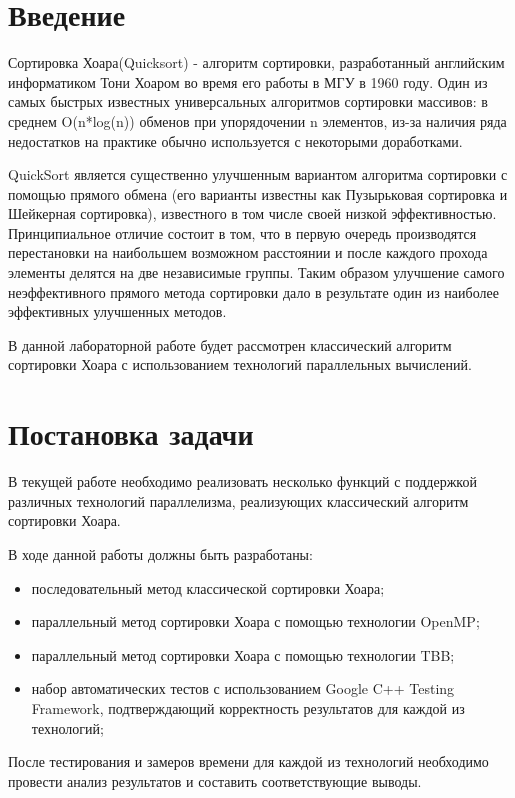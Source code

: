 \documentclass{report}
\begin{document}
\setcounter{page}{2}

\tableofcontents
\newpage

\section*{Введение}
Сортировка Хоара(Quicksort) - алгоритм сортировки, разработанный английским информатиком Тони Хоаром во время его работы в МГУ в 1960 году. Один из самых быстрых известных универсальных алгоритмов сортировки массивов: в среднем O(n*log(n)) обменов при упорядочении n элементов, из-за наличия ряда недостатков на практике обычно используется с некоторыми доработками.
\par QuickSort является существенно улучшенным вариантом алгоритма сортировки с помощью прямого обмена (его варианты известны как Пузырьковая сортировка и Шейкерная сортировка), известного в том числе своей низкой эффективностью. Принципиальное отличие состоит в том, что в первую очередь производятся перестановки на наибольшем возможном расстоянии и после каждого прохода элементы делятся на две независимые группы. Таким образом улучшение самого неэффективного прямого метода сортировки дало в результате один из наиболее эффективных улучшенных методов.
\par В данной лабораторной работе будет рассмотрен классический алгоритм сортировки Хоара с использованием технологий параллельных вычислений.
\newpage

\section*{Постановка задачи}
В текущей работе необходимо реализовать несколько функций с поддержкой различных технологий параллелизма, реализующих классический алгоритм сортировки Хоара.
\par В ходе данной работы должны быть разработаны:
\begin{itemize}
\item последовательный метод классической сортировки Хоара;
\item параллельный метод сортировки Хоара с помощью технологии OpenMP;
\item параллельный метод сортировки Хоара с помощью технологии TBB;
\item набор автоматических тестов с использованием Google C++ Testing Framework, подтверждающий корректность результатов для каждой из технологий;
\end{itemize}
\par После тестирования и замеров времени для каждой из технологий необходимо провести анализ результатов и составить соответствующие выводы.
\end{document}
